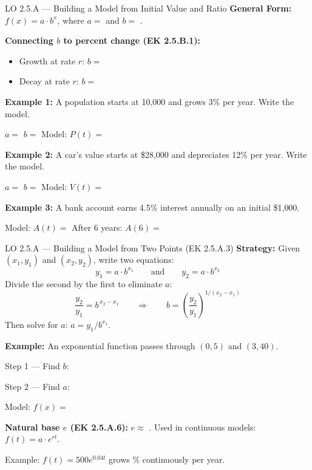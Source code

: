 \documentclass[10pt]{article}
\begin{document}
\vspace{0.06in}

\begin{notesbox}{LO 2.5.A --- Building a Model from Initial Value and Ratio}
\textbf{General Form:} $f(x) = a \cdot b^x$, where $a = $ \blank{3cm} and $b = $ \blank{3cm}.

\medskip
\textbf{Connecting $b$ to percent change (EK 2.5.B.1):}
\begin{itemize}[itemsep=3pt]
  \item Growth at rate $r$: $b = $ \blank{2.5cm}
  \item Decay at rate $r$: $b = $ \blank{2.5cm}
\end{itemize}

\medskip
\textbf{Example 1:} A population starts at 10{,}000 and grows 3\% per year. Write the model.

\smallskip
$a = $ \blank{2.5cm} \quad $b = $ \blank{2.5cm} \quad Model: $P(t) = $ \blank{5cm}

\medskip
\textbf{Example 2:} A car's value starts at \$28{,}000 and depreciates 12\% per year. Write the model.

\smallskip
$a = $ \blank{2.5cm} \quad $b = $ \blank{2.5cm} \quad Model: $V(t) = $ \blank{5cm}

\medskip
\textbf{Example 3:} A bank account earns 4.5\% interest annually on an initial \$1{,}000.

\smallskip
Model: $A(t) = $ \blank{7cm} \quad After 6 years: $A(6) = $ \blank{3cm}
\end{notesbox}

\vspace{0.06in}

\begin{notesbox}{LO 2.5.A --- Building a Model from Two Points (EK 2.5.A.3)}
\textbf{Strategy:} Given $(x_1, y_1)$ and $(x_2, y_2)$, write two equations:
\[
  y_1 = a \cdot b^{x_1} \qquad \text{and} \qquad y_2 = a \cdot b^{x_2}
\]
Divide the second by the first to eliminate $a$:
\[
  \frac{y_2}{y_1} = b^{\,x_2 - x_1} \qquad \Rightarrow \qquad b = \left(\frac{y_2}{y_1}\right)^{1/(x_2-x_1)}
\]
Then solve for $a$: $a = y_1 / b^{x_1}$.

\medskip
\textbf{Example:} An exponential function passes through $(0, 5)$ and $(3, 40)$.

\smallskip
Step 1 --- Find $b$: \blank{8cm}

\smallskip
Step 2 --- Find $a$: \blank{6cm}

\smallskip
Model: $f(x) = $ \blank{6cm}

\medskip
\textbf{Natural base $e$ (EK 2.5.A.6):} $e \approx $ \blank{2cm}. Used in continuous models: $f(t) = a \cdot e^{rt}$.

Example: $f(t) = 500 e^{0.04t}$ grows \blank{2cm}\% continuously per year.
\end{notesbox}
\end{document}
